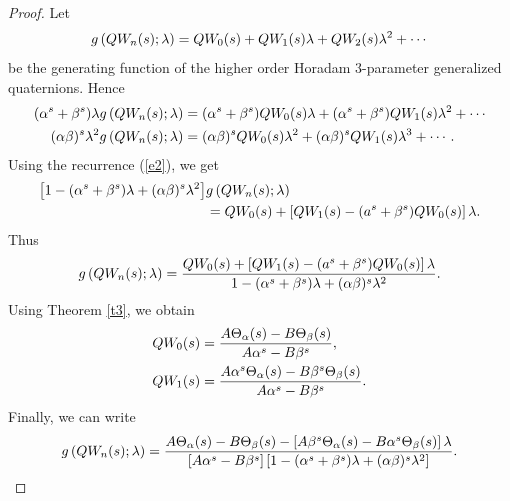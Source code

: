 \documentclass[10pt,a4paper]{amsart}
\begin{document}
\begin{proof}
Let
\[
g\left(\textnormal{\textbf{Q}}W_{n}(s);\lambda\right)=\textnormal{\textbf{Q}}W_{0}(s)+\textnormal{\textbf{Q}}W_{1}(s)\lambda+\textnormal{\textbf{Q}}W_{2}(s)\lambda^{2}+\cdots 
\]
be the generating function of the higher order Horadam 3-parameter generalized quaternions. Hence
\begin{align*}
(\alpha^{s}+\beta^{s})\lambda g\left(\textnormal{\textbf{Q}}W_{n}(s);\lambda\right)&=(\alpha^{s}+\beta^{s})\textnormal{\textbf{Q}}W_{0}(s)\lambda+(\alpha^{s}+\beta^{s})\textnormal{\textbf{Q}}W_{1}(s)\lambda^{2}+\cdots \\
(\alpha\beta)^{s}\lambda^{2} g\left(\textnormal{\textbf{Q}}W_{n}(s);\lambda\right)&=(\alpha\beta)^{s}\textnormal{\textbf{Q}}W_{0}(s)\lambda^{2}+(\alpha\beta)^{s}\textnormal{\textbf{Q}}W_{1}(s)\lambda^{3}+\cdots .
\end{align*}
Using the recurrence (\ref{e2}), we get
\begin{align*}
\left[1-(\alpha^{s}+\beta^{s})\lambda+(\alpha\beta)^{s}\lambda^{2}\right]&g\left(\textnormal{\textbf{Q}}W_{n}(s);\lambda\right)\\
&=\textnormal{\textbf{Q}}W_{0}(s)+\left[\textnormal{\textbf{Q}}W_{1}(s)-(a^{s}+\beta^{s})\textnormal{\textbf{Q}}W_{0}(s)\right]\lambda .
\end{align*}
Thus
\[
g\left(\textnormal{\textbf{Q}}W_{n}(s);\lambda\right)=\frac{\textnormal{\textbf{Q}}W_{0}(s)+\left[\textnormal{\textbf{Q}}W_{1}(s)-(a^{s}+\beta^{s})\textnormal{\textbf{Q}}W_{0}(s)\right]\lambda}{1-(\alpha^{s}+\beta^{s})\lambda+(\alpha\beta)^{s}\lambda^{2}}.
\]
Using Theorem \ref{t3}, we obtain
\begin{align*}
\textnormal{\textbf{Q}}W_{0}(s)&=\frac{A\Theta_{\alpha}(s)-B\Theta_{\beta}(s)}{A\alpha^{s}-B\beta^{s}},\\
\textnormal{\textbf{Q}}W_{1}(s)&=\frac{A\alpha^{s}\Theta_{\alpha}(s)-B\beta^{s}\Theta_{\beta}(s)}{A\alpha^{s}-B\beta^{s}}.
\end{align*}
Finally, we can write 
\[
g\left(\textnormal{\textbf{Q}}W_{n}(s);\lambda\right)=\frac{A\Theta_{\alpha}(s)-B\Theta_{\beta}(s)-\left[A\beta^{s}\Theta_{\alpha}(s)-B\alpha^{s}\Theta_{\beta}(s)\right]\lambda}{\left[A\alpha^{s}-B\beta^{s}\right]\left[1-(\alpha^{s}+\beta^{s})\lambda+(\alpha\beta)^{s}\lambda^{2}\right]}.
\]
\end{proof}
\end{document}
